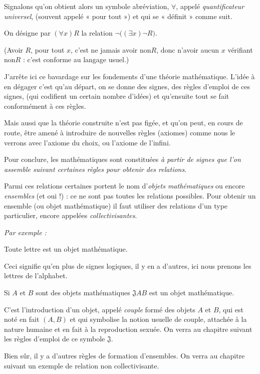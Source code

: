 Signalons qu'on obtient alors un symbole abréviation, $\forall$, appelé \emph{quantificateur universel}, (souvent appelé « pour tout ») et qui se « définit » comme suit.

\begin{logicbox}
On désigne par $\boxed{(\forall x)R}$ la relation $\boxed{\neg\bigl((\exists x)\neg R\bigr)}$.
\end{logicbox}
(Avoir $R$, pour tout $x$, c'est ne jamais avoir non$R$, donc n'avoir aucun $x$ vérifiant non$R$ : c'est conforme au langage usuel.)

J'arrête ici ce bavardage sur les fondements d'une théorie mathématique. L'idée à en dégager c'est qu'au départ, on se donne des signes, des règles d'emploi de ces signes, (qui codifient un certain nombre d'idées) et qu'ensuite tout se fait conformément à ces règles.

Mais aussi que la théorie construite n'est pas figée, et qu'on peut, en cours de route, être amené à introduire de nouvelles règles (axiomes) comme nous le verrons avec l'axiome du choix, ou l'axiome de l'infini.

Pour conclure, les mathématiques sont constituées \emph{à partir de signes que l'on assemble suivant certaines règles pour obtenir des relations}.

Parmi ces relations certaines portent le nom d'\emph{objets mathématiques} ou encore \emph{ensembles} (et oui !) : ce ne sont pas toutes les relations possibles. Pour obtenir un ensemble (ou objet mathématique) il faut utiliser des relations d'un type particulier, encore appelées \emph{collectivisantes}.

\emph{Par exemple :}
\begin{description}[leftmargin=4em,labelwidth=3.4em,labelsep=.6em,font=\itshape]
\item[OM1] Toute lettre est un objet mathématique.
\end{description}
Ceci signifie qu'en plus de signes logiques, il y en a d'autres, ici nous prenons les lettres de l'alphabet.

\begin{description}[leftmargin=4em,labelwidth=3.4em,labelsep=.6em,font=\itshape]
\item[OM2] Si $A$ et $B$ sont des objets mathématiques $\mathfrak J AB$ est un objet mathématique.
\end{description}
C'est l'introduction d'un objet, appelé \emph{couple} formé des objets $A$ et $B$, qui est noté en fait $(A,B)$ et qui symbolise la notion usuelle de couple, attachée à la nature humaine et en fait à la reproduction sexuée. On verra au chapitre suivant les règles d'emploi de ce symbole $\mathfrak J$.

Bien sûr, il y a d'autres règles de formation d'ensembles. On verra au chapitre suivant un exemple de relation non collectivisante.

